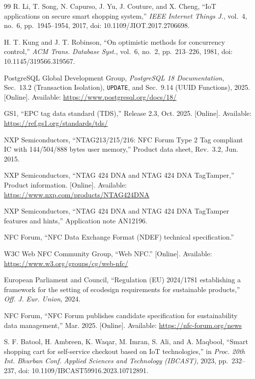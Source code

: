 \documentclass[conference]{IEEEtran}
\begin{document}
\begin{thebibliography}{99}
R. Li, T. Song, N. Capurso, J. Yu, J. Couture, and X. Cheng, ``IoT
applications on secure smart shopping system,'' \emph{IEEE Internet
Things J.}, vol.~4, no.~6, pp.~1945--1954, 2017, doi:
10.1109/JIOT.2017.2706698.

H. T. Kung and J. T. Robinson, ``On optimistic methods for
concurrency control,'' \emph{ACM Trans. Database Syst.}, vol.~6,
no.~2, pp.~213--226, 1981, doi: 10.1145/319566.319567.

PostgreSQL Global Development Group, \emph{PostgreSQL 18
Documentation}, Sec.~13.2 (Transaction Isolation), \texttt{UPDATE},
and Sec.~9.14 (UUID Functions), 2025. [Online]. Available:
\url{https://www.postgresql.org/docs/18/}

GS1, ``EPC tag data standard (TDS),'' Release 2.3, Oct. 2025.
[Online]. Available: \url{https://ref.gs1.org/standards/tds/}

NXP Semiconductors, ``NTAG213/215/216: NFC Forum Type 2 Tag compliant
IC with 144/504/888 bytes user memory,'' Product data sheet, Rev.~3.2,
Jun. 2015.

NXP Semiconductors, ``NTAG 424 DNA and NTAG 424 DNA TagTamper,''
Product information. [Online]. Available:
\url{https://www.nxp.com/products/NTAG424DNA}

NXP Semiconductors, ``NTAG 424 DNA and NTAG 424 DNA TagTamper
features and hints,'' Application note AN12196.

NFC Forum, ``NFC Data Exchange Format (NDEF) technical
specification.''

W3C Web NFC Community Group, ``Web NFC.'' [Online]. Available:
\url{https://www.w3.org/groups/cg/web-nfc/}

European Parliament and Council, ``Regulation (EU) 2024/1781
establishing a framework for the setting of ecodesign requirements
for sustainable products,'' \emph{Off. J. Eur. Union}, 2024.

NFC Forum, ``NFC Forum publishes candidate specification for
sustainability data management,'' Mar. 2025. [Online]. Available:
\url{https://nfc-forum.org/news}

S. F. Batool, H. Ambreen, K. Waqar, M. Imran, S. Ali, and A. Maqbool,
``Smart shopping cart for self-service checkout based on IoT
technologies,'' in \emph{Proc. 20th Int. Bhurban Conf. Applied
Sciences and Technology (IBCAST)}, 2023, pp.~232--237, doi:
10.1109/IBCAST59916.2023.10712891.


\end{thebibliography}
\end{document}
